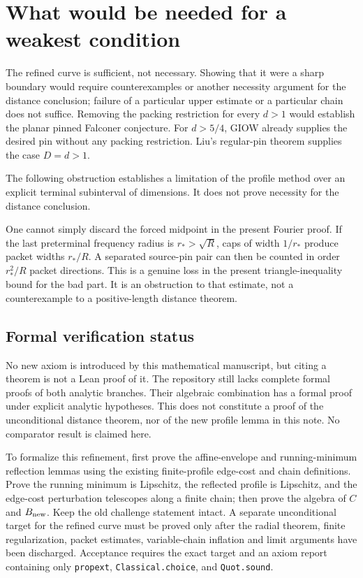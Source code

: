 \documentclass[11pt]{article}
\theoremstyle{definition}\newtheorem{remark}[theorem]{Remark}
\begin{document}
\section{What would be needed for a weakest condition}
The refined curve is sufficient, not necessary. Showing that it were a sharp boundary
would require counterexamples or another necessity argument for the distance conclusion;
failure of a particular upper estimate or a particular chain does not suffice.
Removing the packing restriction for every \(d>1\) would establish the planar pinned
Falconer conjecture. For \(d>5/4\), GIOW already supplies the desired pin without
any packing restriction. Liu's regular-pin theorem \cite{liu2026} supplies the
case \(D=d>1\).

The following obstruction establishes a limitation of the profile method over
an explicit terminal subinterval of dimensions. It does not prove necessity for
the distance conclusion.



One cannot simply discard the forced midpoint in the present Fourier proof.
If the last preterminal frequency radius is \(r_*>\sqrt R\), caps of width \(1/r_*\)
produce packet widths \(r_*/R\). A separated source-pin pair can then be counted
in order \(r_*^2/R\) packet directions. This is a genuine loss in the present
triangle-inequality bound for the bad part. It is an obstruction to that estimate,
not a counterexample to a positive-length distance theorem.

\subsection{Formal verification status}
No new axiom is introduced by this mathematical manuscript, but citing a theorem is
not a Lean proof of it. The repository still lacks complete formal proofs of both
analytic branches. Their algebraic combination has a formal proof under explicit
analytic hypotheses. This does not constitute a proof of the unconditional distance
theorem, nor of the new profile lemma in this note. No comparator result is claimed here.

To formalize this refinement, first prove the affine-envelope and running-minimum reflection lemmas using the
existing finite-profile edge-cost and chain definitions. Prove the running minimum
is Lipschitz, the reflected profile is Lipschitz, and the edge-cost perturbation
telescopes along a finite chain; then prove the algebra of \(C\) and
\(B_{\rm new}\). Keep the old challenge statement intact. A separate unconditional
target for the refined curve must be proved only after the radial theorem, finite
regularization, packet estimates, variable-chain inflation and limit arguments have
been discharged. Acceptance requires the exact target and an axiom report containing
only \texttt{propext}, \texttt{Classical.choice}, and \texttt{Quot.sound}.
\end{document}
